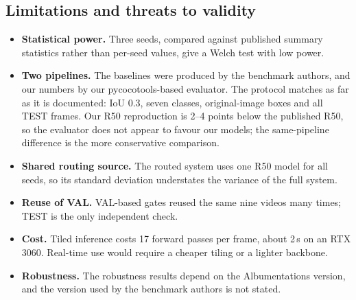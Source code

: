 \subsection{Limitations and threats to validity}
\begin{itemize}
\item \textbf{Statistical power.} Three seeds, compared against published summary statistics rather than per-seed values, give a Welch test with low power.
\item \textbf{Two pipelines.} The baselines were produced by the benchmark authors, and our numbers by our pycocotools-based evaluator. The protocol matches as far as it is documented: IoU 0.3, seven classes, original-image boxes and all TEST frames. Our R50 reproduction is 2--4 points below the published R50, so the evaluator does not appear to favour our models; the same-pipeline difference is the more conservative comparison.
\item \textbf{Shared routing source.} The routed system uses one R50 model for all seeds, so its standard deviation understates the variance of the full system.
\item \textbf{Reuse of VAL.} VAL-based gates reused the same nine videos many times; TEST is the only independent check.
\item \textbf{Cost.} Tiled inference costs 17 forward passes per frame, about 2\,s on an RTX 3060. Real-time use would require a cheaper tiling or a lighter backbone.
\item \textbf{Robustness.} The robustness results depend on the Albumentations version, and the version used by the benchmark authors is not stated.
\end{itemize}
